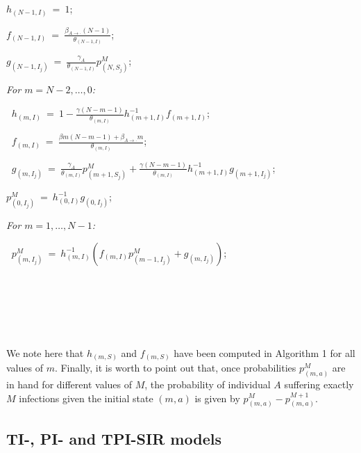 \documentclass[10pt,A4paper]{article}
\begin{document}
\begin{minipage}{9cm}
\begin{description}
  \item $h_{(N-1,I)} ~=~ 1$;
  \item $f_{(N-1,I)} ~=~ \frac{\beta_{A\rightarrow\cdot}(N-1)}{\theta_{(N-1,I)}}$;
  \item $g_{(N-1,I_j)} ~=~ \frac{\gamma_A}{\theta_{(N-1,I)}}p^M_{(N,S_{j})}$;
  \item \it For $m=N-2,\dots,0$:
  \item $~$\hspace{0.5cm} $h_{(m,I)} ~=~ 1-\frac{\gamma(N-m-1)}{\theta_{(m,I)}}h_{(m+1,I)}^{-1}f_{(m+1,I)}$;
  \item $~$\hspace{0.5cm} $f_{(m,I)} ~=~ \frac{\beta m(N-m-1)+\beta_{A\rightarrow\cdot}m}{\theta_{(m,I)}}$;
\end{description}
\end{minipage}\begin{minipage}{9cm}
\begin{description}
  \item $~$\hspace{0.5cm} $g_{(m,I_j)} ~=~ \frac{\gamma_A}{\theta_{(m,I)}}p^M_{(m+1,S_j)}+\frac{\gamma(N-m-1)}{\theta_{(m,I)}}h_{(m+1,I)}^{-1}g_{(m+1,I_j)}$;
  \item $p^M_{(0,I_j)} ~=~ h_{(0,I)}^{-1}g_{(0,I_j)}$;
  \item \it For $m=1,\dots,N-1$:
  \item $~$\hspace{0.5cm} $p^M_{(m,I_j)} ~=~ h_{(m,I)}^{-1}\left(f_{(m,I)}p^M_{(m-1,I_j)}+g_{(m,I_j)}\right)$;
  \item $~$
  \item $~$
  \item $~$
\end{description}
\end{minipage}

\par\noindent We note here that $h_{(m,S)}$ and $f_{(m,S)}$ have been computed in Algorithm 1 for all values of $m$. Finally, it is worth to
point out that, once probabilities $p^M_{(m,a)}$ are in hand for different values of $M$, the probability of individual $A$
suffering exactly $M$ infections given the initial state $(m,a)$ is given by $p^M_{(m,a)}-p^{M+1}_{(m,a)}$.

\subsection{TI-, PI- and TPI-SIR models}
\end{document}
